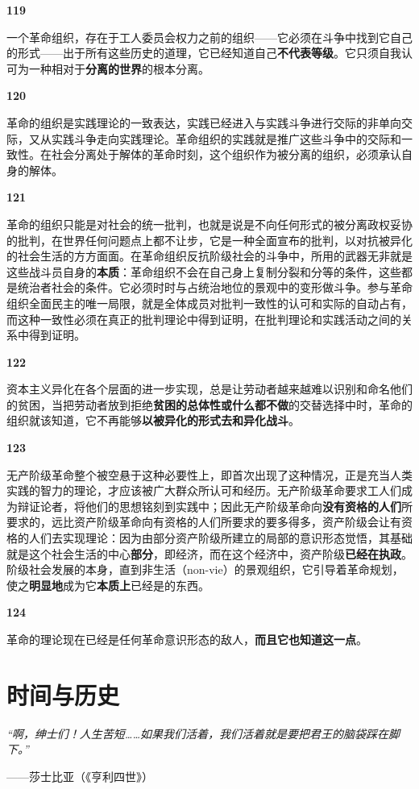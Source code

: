 \documentclass[fontset=fandol, a4paper, 12pt, openright]{ctexbook}
\makeatletter
\renewenvironment{quote}
  {\list{}{\rightmargin\leftmargin}%
   \item\relax\small\itshape\color{darkgray}}
  {\endlist}
\newcommand{\thesis}[1]{%
    \par\vspace{1.5em}%
    {\centering \textbf{\Large #1}\par}%
    \nobreak\vspace{0.5em}\nobreak
    \@afterindenttrue %
    \@afterheading    %
}
\makeatother
\begin{document}
\thesis{119}
一个革命组织，存在于工人委员会权力之前的组织——它必须在斗争中找到它自己的形式——出于所有这些历史的道理，它已经知道自己\textbf{不代表等级}。它只须自我认可为一种相对于\textbf{分离的世界}的根本分离。

\thesis{120}
革命的组织是实践理论的一致表达，实践已经进入与实践斗争进行交际的非单向交际，又从实践斗争走向实践理论。革命组织的实践就是推广这些斗争中的交际和一致性。在社会分离处于解体的革命时刻，这个组织作为被分离的组织，必须承认自身的解体。

\thesis{121}
革命的组织只能是对社会的统一批判，也就是说是不向任何形式的被分离政权妥协的批判，在世界任何问题点上都不让步，它是一种全面宣布的批判，以对抗被异化的社会生活的方方面面。在革命组织反抗阶级社会的斗争中，所用的武器无非就是这些战斗员自身的\textbf{本质}：革命组织不会在自己身上复制分裂和分等的条件，这些都是统治者社会的条件。它必须时时与占统治地位的景观中的变形做斗争。参与革命组织全面民主的唯一局限，就是全体成员对批判一致性的认可和实际的自动占有，而这种一致性必须在真正的批判理论中得到证明，在批判理论和实践活动之间的关系中得到证明。

\thesis{122}
资本主义异化在各个层面的进一步实现，总是让劳动者越来越难以识别和命名他们的贫困，当把劳动者放到拒绝\textbf{贫困的总体性或什么都不做}的交替选择中时，革命的组织就该知道，它不再能够\textbf{以被异化的形式去和异化战斗}。

\thesis{123}
无产阶级革命整个被空悬于这种必要性上，即首次出现了这种情况，正是充当人类实践的智力的理论，才应该被广大群众所认可和经历。无产阶级革命要求工人们成为辩证论者，将他们的思想铭刻到实践中；因此无产阶级革命向\textbf{没有资格的人们}所要求的，远比资产阶级革命向有资格的人们所要求的要多得多，资产阶级会让有资格的人们去实现理论：因为由部分资产阶级所建立的局部的意识形态觉悟，其基础就是这个社会生活的中心\textbf{部分}，即经济，而在这个经济中，资产阶级\textbf{已经在执政}。阶级社会发展的本身，直到非生活（non-vie）的景观组织，它引导着革命规划，使之\textbf{明显地}成为它\textbf{本质上}已经是的东西。

\thesis{124}
革命的理论现在已经是任何革命意识形态的敌人，\textbf{而且它也知道这一点}。


\chapter{时间与历史}

\begin{quote}
“啊，绅士们！人生苦短……如果我们活着，我们活着就是要把君王的脑袋踩在脚下。”

\begin{flushright}
——莎士比亚（《亨利四世》）
\end{flushright}
\end{quote}
\end{document}
